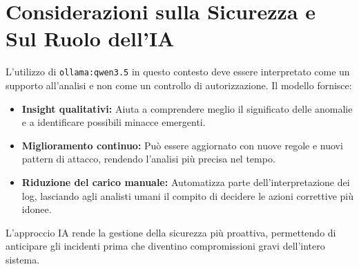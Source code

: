 \section{Considerazioni sulla Sicurezza e Sul Ruolo dell'IA}

L'utilizzo di \texttt{ollama:qwen3.5} in questo contesto deve essere interpretato come un supporto all'analisi e non come un controllo di autorizzazione. Il modello fornisce:

\begin{itemize}
    \item \textbf{Insight qualitativi:} Aiuta a comprendere meglio il significato delle anomalie e a identificare possibili minacce emergenti.
    \item \textbf{Miglioramento continuo:} Può essere aggiornato con nuove regole e nuovi pattern di attacco, rendendo l'analisi più precisa nel tempo.
    \item \textbf{Riduzione del carico manuale:} Automatizza parte dell'interpretazione dei log, lasciando agli analisti umani il compito di decidere le azioni correttive più idonee.
\end{itemize}

L'approccio IA rende la gestione della sicurezza più proattiva, permettendo di anticipare gli incidenti prima che diventino compromissioni gravi dell'intero sistema.
